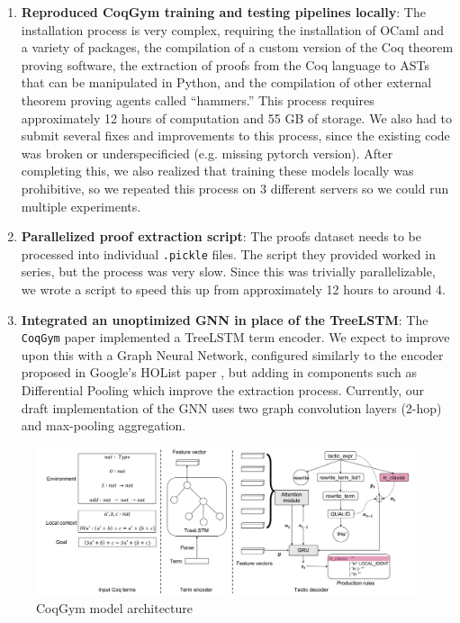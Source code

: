 \documentclass{article}
\begin{document}
\begin{enumerate}
    \item \textbf{Reproduced CoqGym training and testing pipelines locally}: The installation process is very complex, requiring the installation of OCaml and a variety of packages, the compilation of a custom version of the Coq theorem proving software, the extraction of proofs from the Coq language to ASTs that can be manipulated in Python, and the compilation of other external theorem proving agents called ``hammers.'' This process requires approximately 12 hours of computation and 55 GB of storage. We also had to submit several fixes and improvements to this process, since the existing code was broken or underspecificied (e.g. missing pytorch version). After completing this, we also realized that training these models locally was prohibitive, so we repeated this process on 3 different servers so we could run multiple experiments.
    \item \textbf{Parallelized proof extraction script}: The proofs dataset needs to be processed into individual \texttt{.pickle} files. The script they provided worked in series, but the process was very slow. Since this was trivially parallelizable, we wrote a script to speed this up from approximately 12 hours to around 4.
    \item \textbf{Integrated an unoptimized GNN in place of the TreeLSTM}: The \texttt{CoqGym} paper \cite{coqgym} implemented a TreeLSTM term encoder. We expect to improve upon this with a Graph Neural Network, configured similarly to the encoder proposed in Google's HOList paper \cite{hol}, but adding in components such as Differential Pooling\cite{hier} which improve the extraction process. Currently, our draft implementation of the GNN uses two graph convolution layers (2-hop) and max-pooling aggregation. 
\end{enumerate}

\begin{figure}[H]
    \centering
    \includegraphics[width=1\textwidth]{images/coqgym.png}
    \caption{CoqGym model architecture \cite{coqgym}}
    \label{fig:coq_arch}
\end{figure}
\end{document}
